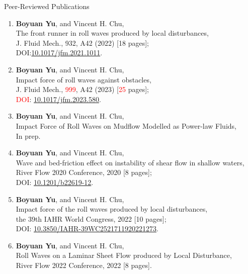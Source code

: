 \documentclass{resume} %
\begin{document}
\begin{rSection}{Peer-Reviewed Publications}

\begin{enumerate}
	\item \textbf{Boyuan Yu}, and Vincent H. Chu,\\
	The front runner in roll waves produced by local disturbances,\\
	J. Fluid Mech., 932, A42 (2022) [18 pages];\\
	DOI:\href{https://doi.org/10.1017/jfm.2021.1011}{10.1017/jfm.2021.1011}.
	
	\item \textbf{Boyuan Yu}, and Vincent H. Chu,\\
	Impact force of roll waves against obstacles,\\
	J. Fluid Mech., \textcolor{red}{999}, A42 (2023) [\textcolor{red}{25} pages];\\
	\textcolor{red}{DOI}:  \href{https://doi.org/10.1017/jfm.2023.580}{10.1017/jfm.2023.580}.
	
	\item \textbf{Boyuan Yu}, and Vincent H. Chu,\\
	Impact Force of Roll Waves on Mudflow Modelled
	as Power-law Fluids,\\
	In prep.
	
	\item \textbf{Boyuan Yu}, and Vincent H. Chu,\\
	Wave and bed-friction effect on instability of shear flow in shallow waters,\\
	River Flow 2020 Conference, 2020 [8 pages];\\
	DOI: \href{https://doi.org/10.1201/b22619-12}{10.1201/b22619-12}.
	
	\item \textbf{Boyuan Yu}, and Vincent H. Chu,\\
	Impact force of the roll waves produced by local disturbances,\\
	the 39th IAHR World Congress, 2022 [10 pages];\\
	DOI: \href{https://doi.org/10.3850/IAHR-39WC2521711920221273}{10.3850/IAHR-39WC2521711920221273}.
	
	\item \textbf{Boyuan Yu}, and Vincent H. Chu,\\
	Roll Waves on a Laminar Sheet Flow produced by Local Disturbance,\\
	River Flow 2022 Conference, 2022 [8 pages].
	

\end{enumerate}
\end{rSection}
\end{document}
